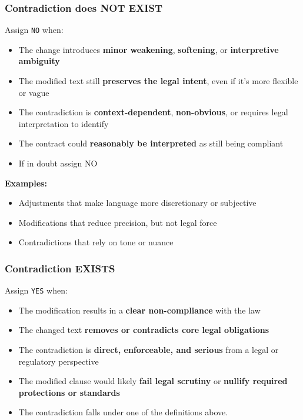 \documentclass[11pt]{article}
\begin{document}
\begin{tcolorbox}[breakable,colback=lightestgray,colframe=black,title=\textbf{Legal LLM Validation Prompt}]
\subsubsection*{\textbf{Contradiction does NOT EXIST}}

Assign \texttt{NO} when:
\begin{itemize}
    \item The change introduces \textbf{minor weakening}, \textbf{softening}, or \textbf{interpretive ambiguity}
    \item The modified text still \textbf{preserves the legal intent}, even if it's more flexible or vague
    \item The contradiction is \textbf{context-dependent}, \textbf{non-obvious}, or requires legal interpretation to identify
    \item The contract could \textbf{reasonably be interpreted} as still being compliant
    \item If in doubt assign NO
\end{itemize}

\textbf{Examples:}
\begin{itemize}
    \item Adjustments that make language more discretionary or subjective
    \item Modifications that reduce precision, but not legal force
    \item Contradictions that rely on tone or nuance
\end{itemize}

\subsubsection*{\textbf{Contradiction EXISTS}}

Assign \texttt{YES} when:
\begin{itemize}
    \item The modification results in a \textbf{clear non-compliance} with the law
    \item The changed text \textbf{removes or contradicts core legal obligations}
    \item The contradiction is \textbf{direct, enforceable, and serious} from a legal or regulatory perspective
    \item The modified clause would likely \textbf{fail legal scrutiny} or \textbf{nullify required protections or standards}
    \item The contradiction falls under one of the definitions above.
\end{itemize}


\end{tcolorbox}
\end{document}
